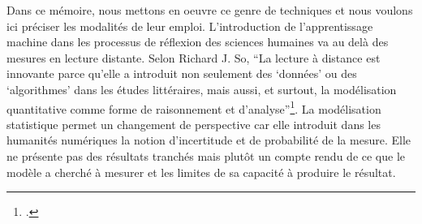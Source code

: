 Dans ce mémoire, nous mettons en oeuvre ce genre de techniques et nous voulons ici préciser les modalités de leur emploi. L'introduction de l'apprentissage machine dans les processus de réflexion des sciences humaines va au delà des mesures en lecture distante. Selon Richard J. So, \enquote{La lecture à distance est innovante parce qu'elle a introduit non seulement des \enquote{données} ou des \enquote{algorithmes} dans les études littéraires, mais aussi, et surtout, la modélisation quantitative comme forme de raisonnement et d'analyse}\footcites{so_all_2017}. La modélisation statistique permet un changement de perspective car elle introduit dans les humanités numériques la notion d'incertitude et de probabilité de la mesure. Elle ne présente pas des résultats tranchés mais plutôt un compte rendu de ce que le modèle a cherché à mesurer et les limites de sa capacité à produire le résultat.



